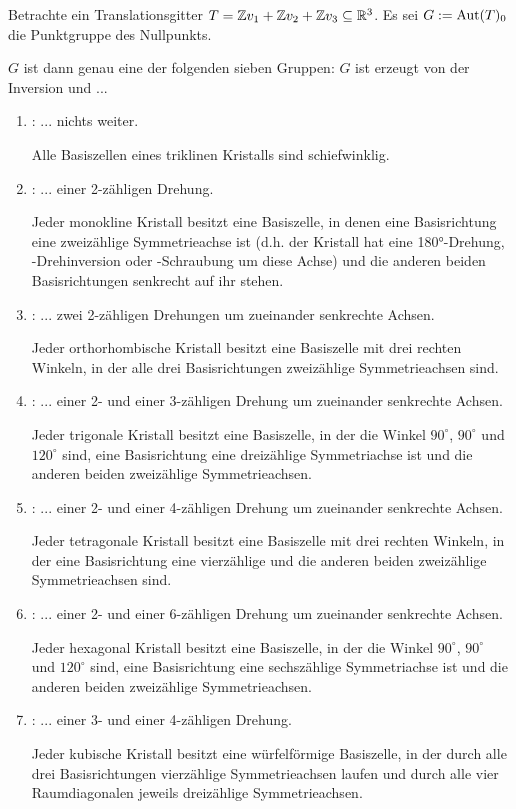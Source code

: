 \begin{theorem}
Betrachte ein Translationsgitter $T=\mathbb{Z} v_1+\mathbb{Z} v_2+\mathbb{Z} v_3\subseteq\mathbb{R}^3$. Es sei $G:=\operatorname{Aut}(T)_0$ die Punktgruppe des Nullpunkts.

$G$ ist dann genau eine der folgenden sieben Gruppen: $G$ ist erzeugt von der Inversion und ...
\begin{enumerate}
\item {}: ... nichts weiter.

Alle Basiszellen eines triklinen Kristalls sind schiefwinklig.

\item {}: ... einer 2-zähligen Drehung.

Jeder monokline Kristall besitzt eine Basiszelle, in denen eine Basisrichtung eine zweizählige Symmetrieachse ist (d.h. der Kristall hat eine 180°-Drehung, -Drehinversion oder -Schraubung um diese Achse) und die anderen beiden Basisrichtungen senkrecht auf ihr stehen.

\item {}: ... zwei 2-zähligen Drehungen um zueinander senkrechte Achsen.

Jeder orthorhombische Kristall besitzt eine Basiszelle mit drei rechten Winkeln, in der alle drei Basisrichtungen zweizählige Symmetrieachsen sind.

\item {}: ... einer 2- und einer 3-zähligen Drehung um zueinander senkrechte Achsen.

Jeder trigonale Kristall besitzt eine Basiszelle, in der die Winkel $90^\circ$, $90^\circ$ und $120^\circ$ sind, eine Basisrichtung eine dreizählige Symmetriachse ist und die anderen beiden zweizählige Symmetrieachsen.

\item {}: ... einer 2- und einer 4-zähligen Drehung um zueinander senkrechte Achsen.

Jeder tetragonale Kristall besitzt eine Basiszelle mit drei rechten Winkeln, in der eine Basisrichtung eine vierzählige und die anderen beiden zweizählige Symmetrieachsen sind.

\item {}: ... einer 2- und einer 6-zähligen Drehung um zueinander senkrechte Achsen.

Jeder hexagonal Kristall besitzt eine Basiszelle, in der die Winkel $90^\circ$, $90^\circ$ und $120^\circ$ sind, eine Basisrichtung eine sechszählige Symmetriachse ist und die anderen beiden zweizählige Symmetrieachsen.

\item {}: ... einer 3- und einer 4-zähligen Drehung.

Jeder kubische Kristall besitzt eine würfelförmige Basiszelle, in der durch alle drei Basisrichtungen vierzählige Symmetrieachsen laufen und durch alle vier Raumdiagonalen jeweils dreizählige Symmetrieachsen.
\end{enumerate}
\end{theorem}

